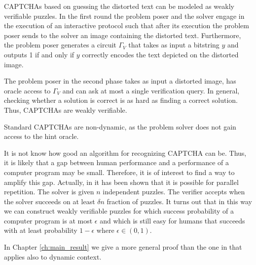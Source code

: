 CAPTCHAs based on guessing the distorted text can be modeled as weakly verifiable puzzles.
In the first round the problem poser and the solver engage in the execution of an interactive protocol
such that after its execution the problem poser sends to the solver an image containing the distorted text.
Furthermore, the problem poser generates a circuit $\Gamma_V$ that takes as input a bitstring $y$ and outputs 1 if and only if $y$ correctly encodes the
text depicted on the distorted image.

The problem poser in the second phase takes as input a distorted image, has oracle access to $\Gamma_V$ and can ask at most a single verification query.
In general, checking whether a solution is correct is as hard as finding a correct solution. Thus, CAPTCHAs are weakly verifiable.

Standard CAPTCHAs are non-dynamic, as the problem solver does not gain access to the hint oracle.

It is not know how good an algorithm for recognizing CAPTCHA can be. Thus, it is likely that a gap between human
performance and a performance of a computer program may be small. Therefore, it is of interest to find a way to amplify this gap.
Actually, in \cite{DBLP:journals/corr/abs-1002-3534} it has been shown that it is possible for parallel repetition.
The solver is given $n$ independent puzzles. The verifier accepts when the solver succeeds on at least $\delta n$ fraction of puzzles.
It turns out that in this way we can construct weakly verifiable puzzles for which success probability of a computer program is at most $\epsilon$ and
which is still easy for humans that succeeds with at least probability $1 - \epsilon$ where $\epsilon \in (0,1)$.

In Chapter \ref{ch:main_result} we give a more general proof than the one in \cite{DBLP:journals/corr/abs-1002-3534} that
applies also to dynamic context.

